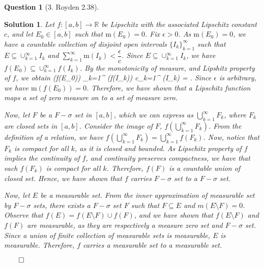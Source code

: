 \documentclass{article} %
\def\eQb#1\eQe{\begin{eqnarray*}#1\end{eqnarray*}}
\theoremstyle{quest}
\newtheorem*{question}{Question}
\newtheorem*{solution}{Solution}
\begin{document}
\begin{question}[3. Royden 2.38]
\end{question}
\begin{solution}
Let $f:[a,b] \to \mathbb{R}$ be Lipschitz with the associated Lipschitz constant $c$,
and let $E_0 \in [a,b]$ such that $\mathrm{m}(E_0) = 0$.
Fix $\epsilon > 0$. As $\mathrm{m}(E_0) = 0$, we have a countable collection of disjoint 
open intervals $\{ I_k \}_{k=1}^{\infty}$ such that $E \subseteq 
\cup_{k=1}^{\infty} I_k$ and $\sum_{k=1}^{\infty}
\mathrm{m}(I_k) < \dfrac{\epsilon}{c}$. Since $E \subseteq \cup_{k=1}^{\infty} 
I_k$, we have $f(E_0) \subseteq \cup_{k=1}^{\infty} f(I_k)$. By the monotonicity
of measure, and Lipshitz property of $f$, we obtain
\eQb
\mathrm{m}(f(E_0)) \leq \sum_{k=1}^{\infty} (f(I_k)) 
\leq c\sum_{k=1}^{\infty} (I_k) = \epsilon.
\eQe
Since $\epsilon$ is arbitrary, we have $\mathrm{m}(f(E_0)) = 0$. Therefore, we have shown that
a Lipschitz function maps a set of zero measure on to a set of measure zero. 

\smallskip

Now, let $F$ be a $F-\sigma$ set in $[a,b]$,
 which we can express as $\bigcup_{k=1}^{\infty} F_k$, where
$F_k$ are closed sets in $[a,b]$. Consider the image of $F$, $f(\bigcup_{k=1}^{\infty} F_k)$.
From the definition of a relation, we have $f(\bigcup_{k=1}^{\infty} F_k) = 
\bigcup_{k=1}^{\infty} f(F_k)$. Now, notice that $F_k$ is compact for all $k$, as it is closed
and bounded. As Lipschitz property of $f$ implies the continuity of $f$, and continuity preserves
compactness, we have that each $f(F_k)$ is compact for all $k$. Therefore, $f(F)$ is a countable
union of closed set. Hence, we have shown that $f$ carries $F-\sigma$ set to a $F-\sigma$ set. 

\smallskip

Now, let $E$ be a measurable set. From the inner approximation of measurable set by $F-\sigma$
sets, there exists a $F-\sigma$ set $F$ such that $F \subseteq E$ and $m(E \setminus F) = 0$.
Observe that $f(E) = f(E \setminus F) \cup f(F)$, and we have shown that $f(E \setminus F)$
and $f(F)$ are measurable, as they are respectively a measure zero set and $F-\sigma$
set. Since a union of finite collection of measurable sets is measurable, $E$ is measurable.
Therefore, $f$ carries a measurable set to a measurable set. 

$\qed$

\end{solution}
\end{document}

